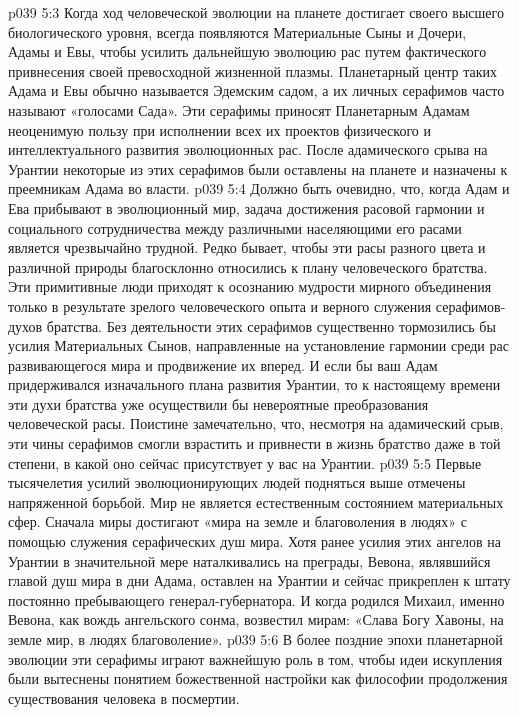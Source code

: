 \vs p039 5:3 \bibnobreakspace {} Когда ход человеческой эволюции на планете достигает своего высшего биологического уровня, всегда появляются Материальные Сыны и Дочери, Адамы и Евы, чтобы усилить дальнейшую эволюцию рас путем фактического привнесения своей превосходной жизненной плазмы. Планетарный центр таких Адама и Евы обычно называется Эдемским садом, а их личных серафимов часто называют «голосами Сада». Эти серафимы приносят Планетарным Адамам неоценимую пользу при исполнении всех их проектов физического и интеллектуального развития эволюционных рас. После адамического срыва на Урантии некоторые из этих серафимов были оставлены на планете и назначены к преемникам Адама во власти.
\vs p039 5:4 \bibnobreakspace {} Должно быть очевидно, что, когда Адам и Ева прибывают в эволюционный мир, задача достижения расовой гармонии и социального сотрудничества между различными населяющими его расами является чрезвычайно трудной. Редко бывает, чтобы эти расы разного цвета и различной природы благосклонно относились к плану человеческого братства. Эти примитивные люди приходят к осознанию мудрости мирного объединения только в результате зрелого человеческого опыта и верного служения серафимов\hyp{}духов братства. Без деятельности этих серафимов существенно тормозились бы усилия Материальных Сынов, направленные на установление гармонии среди рас развивающегося мира и продвижение их вперед. И если бы ваш Адам придерживался изначального плана развития Урантии, то к настоящему времени эти духи братства уже осуществили бы невероятные преобразования человеческой расы. Поистине замечательно, что, несмотря на адамический срыв, эти чины серафимов смогли взрастить и привнести в жизнь братство даже в той степени, в какой оно сейчас присутствует у вас на Урантии.
\vs p039 5:5 \bibnobreakspace {} Первые тысячелетия усилий эволюционирующих людей подняться выше отмечены напряженной борьбой. Мир не является естественным состоянием материальных сфер. Сначала миры достигают «мира на земле и благоволения в людях» с помощью служения серафических душ мира. Хотя ранее усилия этих ангелов на Урантии в значительной мере наталкивались на преграды, Вевона, являвшийся главой душ мира в дни Адама, оставлен на Урантии и сейчас прикреплен к штату постоянно пребывающего генерал\hyp{}губернатора. И когда родился Михаил, именно Вевона, как вождь ангельского сонма, возвестил мирам: «Слава Богу Хавоны, на земле мир, в людях благоволение».
\vs p039 5:6 В более поздние эпохи планетарной эволюции эти серафимы играют важнейшую роль в том, чтобы идеи искупления были вытеснены понятием божественной настройки как философии продолжения существования человека в посмертии.

